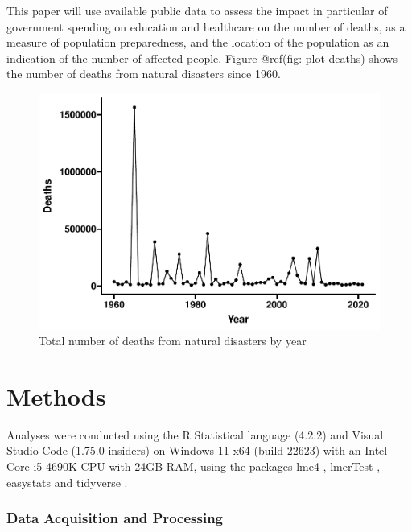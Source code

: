 \documentclass[10pt,a4paper,onecolumn]{article}
\begin{document}
This paper will use available public data to assess the impact in particular of government spending on education and healthcare on the number of deaths, as a measure of population preparedness, and the location of the population as an indication of the number of affected people. Figure @ref(fig: plot-deaths) shows the number of deaths from natural disasters since 1960.

\begin{figure}

{\centering \includegraphics[width=1\linewidth]{disaster_effects_files/figure-latex/plot-deaths-1} 

}

\caption{Total number of deaths from natural disasters by year}\label{fig:plot-deaths}
\end{figure}

\hypertarget{methods}{%
\section{Methods}\label{methods}}

Analyses were conducted using the R Statistical language (4.2.2) \autocite{R-base} and Visual Studio Code (1.75.0-insiders) on Windows 11 x64 (build 22623) with an Intel Core-i5-4690K CPU with 24GB RAM, using the packages lme4 \autocite{R-lme4}, lmerTest \autocite{R-lmerTest}, easystats \autocite{R-easystats} and tidyverse \autocite{R-tidyverse}.

\hypertarget{data-acquisition-and-processing}{%
\subsubsection{Data Acquisition and Processing~}\label{data-acquisition-and-processing}}
\end{document}
